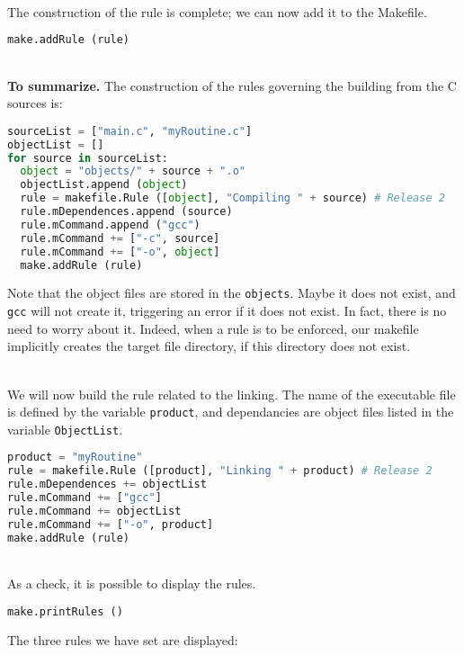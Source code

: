 \documentclass[a4paper,11pt]{extarticle}
\begin{document}
~\\The construction of the rule is complete; we can now add it to the Makefile.
\begin{lstlisting}[language=py]
  make.addRule (rule)
\end{lstlisting}


~\\{\bf To summarize.} The construction of the rules governing the building from the C sources is:
\begin{lstlisting}[language=py]
sourceList = ["main.c", "myRoutine.c"]
objectList = []
for source in sourceList:
  object = "objects/" + source + ".o"
  objectList.append (object)
  rule = makefile.Rule ([object], "Compiling " + source) # Release 2
  rule.mDependences.append (source)
  rule.mCommand.append ("gcc")
  rule.mCommand += ["-c", source]
  rule.mCommand += ["-o", object]
  make.addRule (rule)
\end{lstlisting}
Note that the object files are stored in the \texttt{objects}. Maybe it does not exist, and \texttt{gcc} will not create it, triggering an error if it does not exist. In fact, there is no need to worry about it. Indeed, when a rule is to be enforced, our makefile implicitly creates the target file directory, if this directory does not exist.

~\\We will now build the rule related to the linking. The name of the executable file is defined by the variable \texttt{product}, and dependancies are object files listed in the variable \texttt{ObjectList}.
\begin{lstlisting}[language=py]
product = "myRoutine"
rule = makefile.Rule ([product], "Linking " + product) # Release 2
rule.mDependences += objectList
rule.mCommand += ["gcc"]
rule.mCommand += objectList
rule.mCommand += ["-o", product]
make.addRule (rule)
\end{lstlisting}

~\\As a check, it is possible to display the rules.
\begin{lstlisting}[language=py]
make.printRules ()
\end{lstlisting}

The three rules we have set are displayed:
\end{document}
